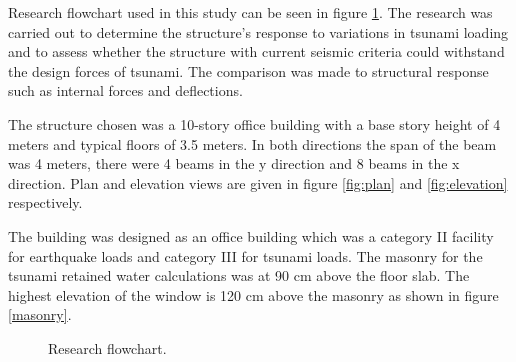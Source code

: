 \documentclass{cup-pan}
\begin{document}
Research flowchart used in this study can be seen in figure \ref{fig: flowchart}. The research was carried out to determine the structure's response to variations in tsunami loading and to assess whether the structure with current seismic criteria could withstand the design forces of tsunami. The comparison was made to structural response such as internal forces and deflections.

The structure chosen was a 10-story office building with a base story height of 4 meters and typical floors of 3.5 meters. In both directions the span of the beam was 4 meters, there were 4 beams in the y direction and 8 beams in the x direction. Plan and elevation views are given in figure \ref{fig:plan} and \ref{fig:elevation} respectively.

The building was designed as an office building which was a category II facility for earthquake loads and category III for tsunami loads. The masonry for the tsunami retained water calculations was at 90 cm above the floor slab. The highest elevation of the window is 120 cm above the masonry as shown in figure \ref{masonry}.


\begin{figure}[H]
\centering
{}

\caption{Research flowchart.}
\label{fig: flowchart}
\end{figure}
\end{document}

